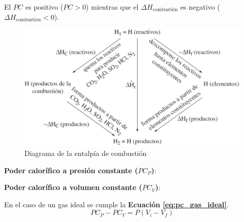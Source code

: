             
            
            \begin{quote}
                \textit{}
            \end{quote}
            
            El \(PC\) es positivo (\(PC > 0\)) mientras que el \(\Delta H_{\text{combustión}}\) es negativo (\(\Delta H_{\text{combustión}} < 0\)).
            
            \begin{figure}
                \centering
                \includegraphics[width=.7\textwidth]{img/esquemas/pc.png}
                \caption{Diagrama de la entalpía de combustión}
                \label{fig:poder_calorifico}
            \end{figure}
            
            \textbf{Poder calorífico a presión constante (\(PC_{P}\))}:
            
            \begin{quote}
                \textit{}
            \end{quote}
            
            \textbf{Poder calorífico a volumen constante (\(PC_{V}\))}:
            
            \begin{quote}
                \textit{}
            \end{quote}
            
            En el caso de un gas ideal se cumple la \textbf{Ecuación \ref{eq:pc_gas_ideal}}.
            \begin{equation}
            \label{eq:pc_gas_ideal}
                {PC}_{P} - {PC}_{V} = P \left ( V_{i} - V_{f} \right )
            \end{equation}
            
